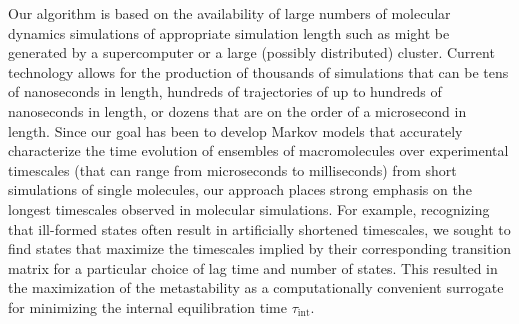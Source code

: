 Our algorithm is based on the availability of large numbers of molecular dynamics simulations of appropriate simulation length such as might be generated by a supercomputer or a large (possibly distributed) cluster.  
Current technology allows for the production of thousands of simulations that can be tens of nanoseconds in length, hundreds of trajectories of up to hundreds of nanoseconds in length, or dozens that are on the order of a microsecond in length.
Since our goal has been to develop Markov models that accurately characterize the time evolution of ensembles of macromolecules over experimental timescales (that can range from microseconds to milliseconds) from short simulations of single molecules, our approach places strong emphasis on the longest timescales observed in molecular simulations.
For example, recognizing that ill-formed states often result in artificially shortened timescales, we sought to find states that maximize the timescales implied by their corresponding transition matrix for a particular choice of lag time and number of states.  
This resulted in the maximization of the metastability as a computationally convenient surrogate for minimizing the internal equilibration time $\tau_{\mathrm{int}}$.


